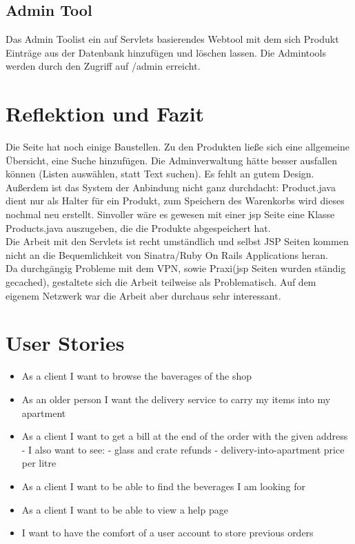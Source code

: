 \documentclass[a4paper, 11pt]{article}
\begin{document}
\subsection{Admin Tool}
Das \grqq Admin Tool\grqq  ist ein auf Servlets basierendes Webtool mit dem sich Produkt Einträge aus der Datenbank hinzufügen und löschen lassen. Die Admintools werden durch den Zugriff auf /admin erreicht. 

\section{Reflektion und Fazit}
Die Seite hat noch einige Baustellen. Zu den Produkten ließe sich eine allgemeine Übersicht, eine Suche hinzufügen. Die Adminverwaltung hätte besser ausfallen können (Listen auswählen, statt Text suchen). Es fehlt an gutem Design.\\

Außerdem ist das System der Anbindung nicht ganz durchdacht: Product.java dient nur als Halter für ein Produkt, zum Speichern des Warenkorbs wird dieses nochmal neu erstellt. Sinvoller wäre es gewesen mit einer jsp Seite eine Klasse Products.java auszugeben, die die Produkte abgespeichert hat. \\

Die Arbeit mit den Servlets ist recht umständlich und selbst JSP Seiten kommen nicht an die Bequemlichkeit von Sinatra/Ruby On Rails Applications heran. \\
Da durchgängig Probleme mit dem VPN, sowie Praxi(jsp Seiten wurden ständig gecached), gestaltete sich die Arbeit teilweise als Problematisch. Auf dem eigenem Netzwerk war die 
Arbeit aber durchaus sehr interessant. 
\section{User Stories}
\begin{itemize}
	\item As a client I want to browse the baverages of the shop
	\item As an older person I want the delivery service to carry my items into my apartment
	\item As a client I want to get a bill at the end of the order with the given address
		- I also want to see:
			- glass and crate refunds
			- delivery-into-apartment price per litre
	\item As a client I want to be able to find the beverages I am looking for
	\item As a client I want to be able to view a help page
	\item I want to have the comfort of a user account to store previous orders
	\end{itemize}
\end{document}
